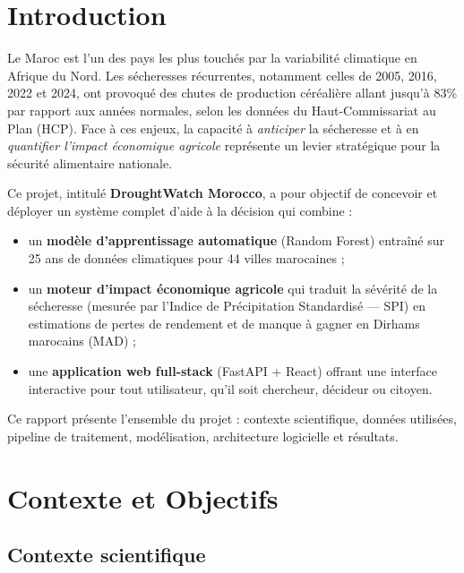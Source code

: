 \documentclass[12pt,a4paper]{report}
\begin{document}
\chapter*{Introduction}

Le Maroc est l'un des pays les plus touchés par la variabilité climatique en Afrique du Nord. Les sécheresses récurrentes, notamment celles de 2005, 2016, 2022 et 2024, ont provoqué des chutes de production céréalière allant jusqu'à 83\% par rapport aux années normales, selon les données du Haut-Commissariat au Plan (HCP). Face à ces enjeux, la capacité à \textit{anticiper} la sécheresse et à en \textit{quantifier l'impact économique agricole} représente un levier stratégique pour la sécurité alimentaire nationale.

Ce projet, intitulé \textbf{DroughtWatch Morocco}, a pour objectif de concevoir et déployer un système complet d'aide à la décision qui combine :
\begin{itemize}
    \item un \textbf{modèle d'apprentissage automatique} (Random Forest) entraîné sur 25 ans de données climatiques pour 44 villes marocaines ;
    \item un \textbf{moteur d'impact économique agricole} qui traduit la sévérité de la sécheresse (mesurée par l'Indice de Précipitation Standardisé — SPI) en estimations de pertes de rendement et de manque à gagner en Dirhams marocains (MAD) ;
    \item une \textbf{application web full-stack} (FastAPI + React) offrant une interface interactive pour tout utilisateur, qu'il soit chercheur, décideur ou citoyen.
\end{itemize}

\vspace{0.3cm}
Ce rapport présente l'ensemble du projet : contexte scientifique, données utilisées, pipeline de traitement, modélisation, architecture logicielle et résultats.

\chapter{Contexte et Objectifs}

\section{Contexte scientifique}
\end{document}
